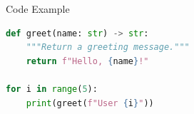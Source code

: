 \begin{frame}[fragile]{Code Example}
  \begin{lstlisting}[language=Python]
def greet(name: str) -> str:
    """Return a greeting message."""
    return f"Hello, {name}!"

for i in range(5):
    print(greet(f"User {i}"))
  \end{lstlisting}
\end{frame}
